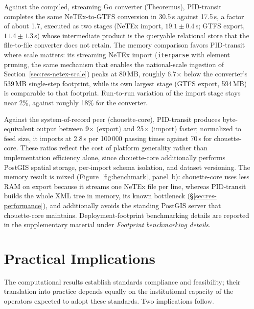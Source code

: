 Against the compiled, streaming Go converter (Theoremus), PID-transit completes
the same NeTEx-to-GTFS conversion in 30.5\,s against 17.5\,s, a factor of about
1.7, executed as two stages (NeTEx import, $19.1 \pm 0.4$\,s; GTFS export,
$11.4 \pm 1.3$\,s) whose intermediate product is the queryable relational store
that the file-to-file converter does not retain. The memory comparison favors
PID-transit where scale matters: its streaming NeTEx import
(\texttt{iterparse} with element pruning, the same mechanism that enables the
national-scale ingestion of Section~\ref{sec:res-netex-scale}) peaks at
80\,MB, roughly 6.7$\times$ below the converter's 539\,MB single-step
footprint, while its own largest stage (GTFS export, 594\,MB) is comparable to
that footprint. Run-to-run variation of the import stage stays near 2\%,
against roughly 18\% for the converter.
 
Against the system-of-record peer (chouette-core), PID-transit produces
byte-equivalent output between 9$\times$ (export) and 25$\times$ (import) faster;
normalized to feed size, it imports at 2.8\,s per 100\,000 passing times against
70\,s for chouette-core. These ratios reflect the cost of platform generality
rather than implementation efficiency alone, since chouette-core additionally
performs PostGIS spatial storage, per-import schema isolation, and dataset
versioning. The memory result is mixed (Figure~\ref{fig:benchmark}, panel~b):
chouette-core uses less RAM on export because it streams one NeTEx file per line,
whereas PID-transit builds the whole XML tree in memory, its known bottleneck
(\S\ref{sec:res-performance}), and additionally avoids the standing PostGIS server
that chouette-core maintains. Deployment-footprint benchmarking details are reported
in the supplementary material under \emph{Footprint benchmarking details}.
 
\section{Practical Implications}
\label{sec:implications}
 
The computational results establish standards compliance and feasibility; their
translation into practice depends equally on the institutional capacity of the
operators expected to adopt these standards. Two implications follow.
 
